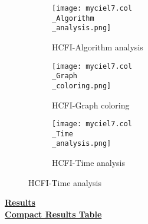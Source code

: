 \documentclass[10pt]{article}
\begin{document}
\graphicspath{{./Core1/Solutions/HCFI/myciel7.col}}
\begin{figure}[H]
\begin{subfigure}{.33\textwidth}
  \centering
  \texttt{[image: myciel7.col\\\_Algorithm\\\_analysis.png]}
  \caption{HCFI-Algorithm analysis}
   \label{fig:subfig1}
\end{subfigure}%
\begin{subfigure}{.33\textwidth}
  \centering
  \texttt{[image: myciel7.col\\\_Graph\\\_coloring.png]}
  \caption{HCFI-Graph coloring}
  \label{fig:subfig2}
\end{subfigure}
\begin{subfigure}{.33\textwidth}
  \centering
  \texttt{[image: myciel7.col\\\_Time\\\_analysis.png]}
  \caption{HCFI-Time analysis}
  \end{subfigure}
\end{figure}
\vspace{2cm}
\begin{center}
\hyperlink{page.8}{\textbf{Results}}\\
\vspace{0.5cm}
\hyperlink{page.71}{\textbf{Compact Results Table}}
\end{center}
\pagebreak
\end{document}
